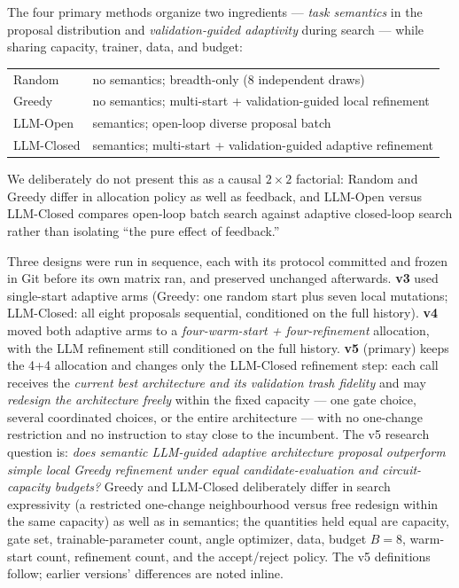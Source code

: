 \documentclass[11pt]{article}
\begin{document}
The four primary methods organize two ingredients --- \emph{task semantics} in the proposal distribution and \emph{validation-guided adaptivity} during search --- while sharing capacity, trainer, data, and budget:

\begin{center}
\begin{tabular}{ll}
\toprule
Random & no semantics; breadth-only (8 independent draws)\\
Greedy & no semantics; multi-start + validation-guided local refinement\\
LLM-Open & semantics; open-loop diverse proposal batch\\
LLM-Closed & semantics; multi-start + validation-guided adaptive refinement\\
\bottomrule
\end{tabular}
\end{center}

We deliberately do not present this as a causal $2\times2$ factorial: Random and Greedy differ in allocation policy as well as feedback, and LLM-Open versus LLM-Closed compares open-loop batch search against adaptive closed-loop search rather than isolating ``the pure effect of feedback.''

Three designs were run in sequence, each with its protocol committed and frozen in Git before its own matrix ran, and preserved unchanged afterwards.
\textbf{v3} used single-start adaptive arms (Greedy: one random start plus seven local mutations; LLM-Closed: all eight proposals sequential, conditioned on the full history).
\textbf{v4} moved both adaptive arms to a \emph{four-warm-start + four-refinement} allocation, with the LLM refinement still conditioned on the full history.
\textbf{v5} (primary) keeps the 4+4 allocation and changes only the LLM-Closed refinement step: each call receives the \emph{current best architecture and its validation trash fidelity} and may \emph{redesign the architecture freely} within the fixed capacity --- one gate choice, several coordinated choices, or the entire architecture --- with no one-change restriction and no instruction to stay close to the incumbent.
The v5 research question is: \emph{does semantic LLM-guided adaptive architecture proposal outperform simple local Greedy refinement under equal candidate-evaluation and circuit-capacity budgets?}
Greedy and LLM-Closed deliberately differ in search expressivity (a restricted one-change neighbourhood versus free redesign within the same capacity) as well as in semantics; the quantities held equal are capacity, gate set, trainable-parameter count, angle optimizer, data, budget $B=8$, warm-start count, refinement count, and the accept/reject policy.
The v5 definitions follow; earlier versions' differences are noted inline.
\end{document}
